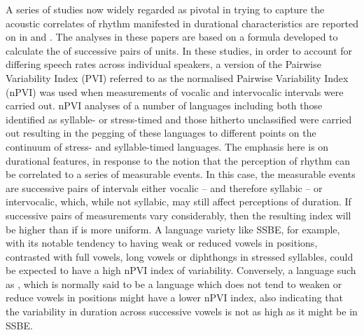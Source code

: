 \documentclass[output=paper]{langsci/langscibook}
\begin{document}
A series of studies now widely regarded as pivotal in trying to capture the acoustic correlates of rhythm manifested in durational characteristics are reported on in \citet{GrabeLow2002} and \citet{Lowetal2000}. The analyses in these papers are based on a formula developed to calculate the  of successive pairs of  units. In these studies, in order to account for differing speech rates across individual speakers, a version of the Pairwise Variability Index (PVI) referred to as the normalised Pairwise Variability Index (nPVI) was used when measurements of vocalic and intervocalic intervals were carried out. nPVI analyses of a number of languages including both those identified as syllable- or stress-timed and those hitherto unclassified were carried out resulting in the pegging of these languages to different points on the continuum of stress- and syllable-timed languages. The emphasis here is on durational features, in response to the notion that the perception of rhythm can be correlated to a series of measurable events. In this case, the measurable events are successive pairs of intervals either vocalic – and therefore syllabic – or intervocalic, which, while not syllabic, may still affect perceptions of duration. If successive pairs of  measurements vary considerably, then the resulting index will be higher than if  is more uniform. A language variety like SSBE, for example, with its notable tendency to having weak or reduced vowels in  positions, contrasted with full vowels, long vowels or diphthongs in stressed syllables, could be expected to have a high nPVI index of variability. Conversely, a language such as , which is normally said to be a language which does not tend to weaken or reduce vowels in  positions \citep{BorgAzzopardi-Alexander1997, Azzopardi1981} might have a lower nPVI index, also indicating that the variability in duration across successive vowels is not as high as it might be in SSBE. 
\end{document}
